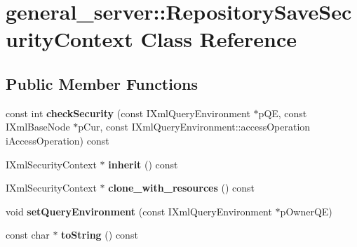 \hypertarget{classgeneral__server_1_1RepositorySaveSecurityContext}{\section{general\-\_\-server\-:\-:\-Repository\-Save\-Security\-Context \-Class \-Reference}
\label{classgeneral__server_1_1RepositorySaveSecurityContext}
}
\subsection*{\-Public \-Member \-Functions}
\begin{DoxyCompactItemize}
\item 
\hypertarget{classgeneral__server_1_1RepositorySaveSecurityContext_a854684e313df65a7ed1bdb15b026a7c8}{const int {\bfseries check\-Security} (const \-I\-Xml\-Query\-Environment $\ast$p\-Q\-E, const \-I\-Xml\-Base\-Node $\ast$p\-Cur, const \-I\-Xml\-Query\-Environment\-::access\-Operation i\-Access\-Operation) const }\label{classgeneral__server_1_1RepositorySaveSecurityContext_a854684e313df65a7ed1bdb15b026a7c8}

\item 
\hypertarget{classgeneral__server_1_1RepositorySaveSecurityContext_a8f832e86bfca2703c6c55d22f6e8a00d}{\-I\-Xml\-Security\-Context $\ast$ {\bfseries inherit} () const }\label{classgeneral__server_1_1RepositorySaveSecurityContext_a8f832e86bfca2703c6c55d22f6e8a00d}

\item 
\hypertarget{classgeneral__server_1_1RepositorySaveSecurityContext_a43fc20ee6d025e77e9488d1de04eed42}{\-I\-Xml\-Security\-Context $\ast$ {\bfseries clone\-\_\-with\-\_\-resources} () const }\label{classgeneral__server_1_1RepositorySaveSecurityContext_a43fc20ee6d025e77e9488d1de04eed42}

\item 
\hypertarget{classgeneral__server_1_1RepositorySaveSecurityContext_a3c9cf8eba9e27755d8be0ca3c9b4d0af}{void {\bfseries set\-Query\-Environment} (const \-I\-Xml\-Query\-Environment $\ast$p\-Owner\-Q\-E)}\label{classgeneral__server_1_1RepositorySaveSecurityContext_a3c9cf8eba9e27755d8be0ca3c9b4d0af}

\item 
\hypertarget{classgeneral__server_1_1RepositorySaveSecurityContext_aa26b58a55975dec26991ae18d652a934}{const char $\ast$ {\bfseries to\-String} () const }\label{classgeneral__server_1_1RepositorySaveSecurityContext_aa26b58a55975dec26991ae18d652a934}


\end{DoxyCompactItemize}
